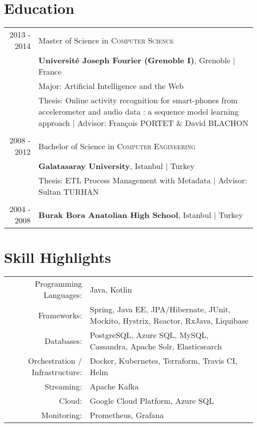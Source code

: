 \documentclass[a4paper,10pt]{article} %
\begin{document}

\section{Education}

\begin{tabular}{r|p{14cm}}

\textsc{2013 - 2014} & Master of Science in \textsc{}\textsc{Computer Science} \\& \normalsize\textbf{Université Joseph Fourier (Grenoble I)}, Grenoble | France\\
&  Major: Artificial Intelligence and the Web\\
& Thesis: Online activity recognition for smart-phones from accelerometer and audio data : a sequence model learning approach | \small Advisor: François \textsc{PORTET} \& David \textsc{BLACHON}  \\
&\\


\textsc{2008 - 2012} & Bachelor of Science in \textsc{}\textsc{Computer Engineering} \\& \normalsize\textbf{Galatasaray University}, Istanbul | Turkey\\
& Thesis: ETL Process Management with Metadata | \small Advisor: Sultan \textsc{TURHAN}\\
&\\


\textsc{2004 - 2008}& \textbf{Burak Bora Anatolian High School}, Istanbul | Turkey
\end{tabular}


\section{Skill Highlights}

\begin{tabular}{r|p{13cm}}
Programming Languages: & Java, Kotlin \\
Frameworks:  & Spring, Java EE, JPA/Hibernate, JUnit, Mockito, Hystrix, Reactor, RxJava, Liquibase \\
Databases: & PostgreSQL, Azure SQL, MySQL, Cassandra, Apache Solr, Elasticsearch \\
Orchestration / Infrastructure: & Docker, Kubernetes, Terraform, Travis CI, Helm \\
Streaming: & Apache Kafka \\
Cloud: & Google Cloud Platform, Azure SQL \\
Monitoring: & Prometheus, Grafana \\

\end{tabular}
\end{document}
